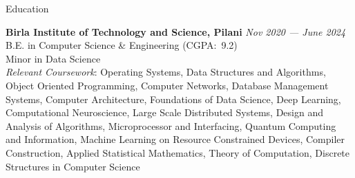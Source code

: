 
\begin{rSection}{Education}
    
    \textbf{Birla Institute of Technology and Science, Pilani} \hfill \textit{Nov 2020 --- June 2024} \\
    B.E. in Computer Science \& Engineering (CGPA:\ 9.2)\\
    Minor in Data Science \smallskip \\
    \textit{Relevant Coursework}: Operating Systems, Data Structures and Algorithms, Object Oriented Programming, 
    Computer Networks, Database Management Systems, Computer Architecture, Foundations of Data Science, 
    Deep Learning, Computational Neuroscience, Large Scale Distributed Systems, Design and Analysis of Algorithms,
    Microprocessor and Interfacing, Quantum Computing and Information, Machine Learning on Resource Constrained Devices,
    Compiler Construction, Applied Statistical Mathematics, Theory of Computation, Discrete Structures in Computer Science
    
\end{rSection}
